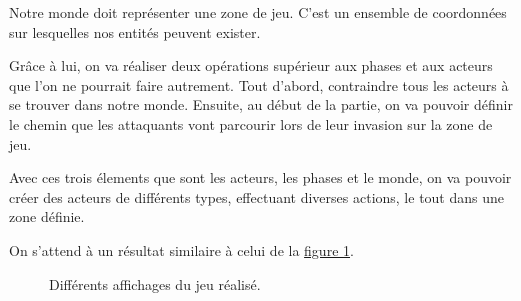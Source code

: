 \documentclass{article}
\begin{document}
Notre monde doit représenter une zone de jeu.
C'est un ensemble de coordonnées sur lesquelles nos entités peuvent exister.

Grâce à lui, on va réaliser deux opérations supérieur aux phases et aux acteurs que 
l'on ne pourrait faire autrement.
Tout d'abord, contraindre tous les acteurs à se trouver dans notre monde.
Ensuite, au début de la partie, on va pouvoir définir le chemin que 
les attaquants vont parcourir lors de leur invasion sur la zone de jeu.

Avec ces trois élements que sont les acteurs, les phases et le monde, on va pouvoir 
créer des acteurs de différents types, effectuant diverses actions, le tout dans une 
zone définie.

On s'attend à un résultat similaire à celui de la  \hyperref[fig:affichages]{figure \ref{fig:affichages}}.

\begin{figure}[H]
    \centering
    \qquad
    \caption{Différents affichages du jeu réalisé.}%
    \label{fig:affichages}%
     \vspace*{-0.3cm}
\end{figure}
\end{document}
